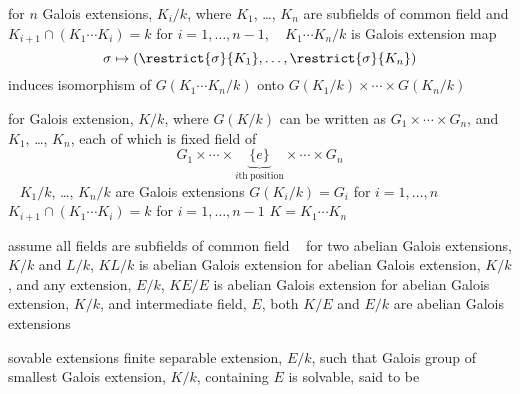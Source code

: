 \documentclass[17pt,landscape]{foils}
\begin{document}
{\begin{figure}
\begin{center}
	\galoiss{4em}
	\label{fig:diagram for Galois two-side lifting}
\end{center}
\end{figure}

\begin{mycorollary}{}
	for $n$ Galois extensions, $K_i/k$,
	where $K_1$, \ldots, $K_n$ are subfields of common field
	and
	$K_{i+1}\cap(K_1\cdots K_i) = k$ for $i=1,\ldots,n-1$,
	\shrinkspacewithintheoremslike\
	\ibit
	\iitem
		$K_1\cdots K_n/k$ is Galois extension
	\iitem
		map
		$$
			\sigma \mapsto (\restrict{\sigma}{K_1}, \ldots, \restrict{\sigma}{K_n})
		$$
		induces
		isomorphism
		of $G(K_1\cdots K_n/k)$ onto $G(K_1/k) \times \cdots \times G(K_n/k)$
	\eit
\end{mycorollary}

\begin{mycorollary}{}
	for Galois extension, $K/k$,
	where $G(K/k)$ can be written as $G_1\times \cdots \times G_n$,
	and
	$K_1$, \ldots, $K_n$,
	each of which is
	fixed field of
	$$
		G_1 \times \cdots \times \underbrace{\{e\}}_{i\mathrm{th\ position}} \times \cdots \times G_n
	$$
	\shrinkspacewithintheoremsliket\
	\ibit
	\iitem
		$K_1/k$, \ldots, $K_n/k$ are Galois extensions
	\iitem
		$G(K_i/k)=G_i$ for $i=1,\ldots,n$
	\iitem
		$K_{i+1}\cap(K_1\cdots K_i) = k$ for $i=1,\ldots,n-1$
	\iitem
		$K=K_1\cdots K_n$
	\eit
\end{mycorollary}

\begin{mytheorem}{}
	assume all fields are subfields of common field
	\shrinkspacewithintheoremslike\
	\ibit
	\iitem
		for two abelian Galois extensions, $K/k$ and $L/k$,
		$KL/k$ is abelian Galois extension
	\iitem
		for abelian Galois extension, $K/k$,
		and any extension, $E/k$,
		$KE/E$ is abelian Galois extension
	\iitem
		for abelian Galois extension, $K/k$, and intermediate field, $E$,
		both $K/E$ and $E/k$ are abelian Galois extensions
	\eit
\end{mytheorem}



\begin{mydefinition}{sovable extensions}
	finite separable extension, $E/k$,
	such that
	Galois group
	of
	smallest Galois extension, $K/k$,
	containing $E$
	is solvable,
	said to be 
\end{mydefinition}

}
\end{document}
